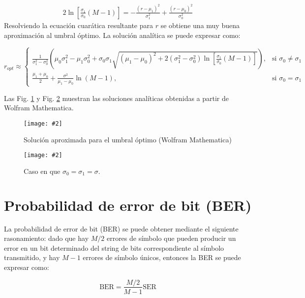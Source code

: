 \documentclass{article}
\newcommand{\fig}[3][1.0]{
    \begin{figure}[!ht]
        \centering
        \texttt{[image: \#2]}
        \caption{#3}
        \label{fig:#2}
    \end{figure}
}
\newcommand{\reffig}[1]{Fig. \ref{fig:#1}}
\begin{document}
        \begin{align}
            2\ln\left[\frac{\sigma_1}{\sigma_0}(M-1)\right] = -\frac{(r-\mu_1)^2}{\sigma_1^2}+\frac{(r-\mu_0)^2}{\sigma_0^2}
        \end{align}
        Resolviendo la ecuación cuarática resultante para $r$ se obtiene una muy buena aproximación al umbral óptimo. La solución analítica se puede expresar como:
        \begin{tcolorbox}[colback=yellow!20!white,colframe=black]
            \[
            r_{opt} \approx
            \begin{cases}
                \frac{1}{\sigma_1^2-\sigma_0^2}\left(\mu_0\sigma_1^2-\mu_1\sigma_0^2+\sigma_0\sigma_1\sqrt{(\mu_1-\mu_0)^2+2(\sigma_1^2-\sigma_0^2)\ln\left[\frac{\sigma_1}{\sigma_0}(M-1)\right]}\right),
                & \text{si } \sigma_0\neq\sigma_1\\
                \frac{\mu_1+\mu_0}{2} + \frac{\sigma^2}{\mu_1-\mu_0}\ln(M-1), & \text{si } \sigma_0=\sigma_1
            \end{cases}
            \]
        \end{tcolorbox}
        Las \reffig{threshold} y \reffig{threshold_s1_igual_s0} muestran
        las soluciones analíticas obtenidas a partir de Wolfram Mathematica. 
        
        \fig[0.9]{threshold}{Solución aproximada para el umbral óptimo (Wolfram Mathematica)}

        \fig[0.9]{threshold_s1_igual_s0}{Caso en que $\sigma_0=\sigma_1=\sigma$.}


\newpage
\section{Probabilidad de error de bit (BER)}
    La probabilidad de error de bit (BER) se puede obtener mediante el siguiente rasonamiento: dado que hay $M/2$ errores de símbolo que pueden producir un error en un bit determinado del string de bits correspondiente al símbolo transmitido, y hay $M-1$ errores de símbolo únicos, entonces la BER se puede expresar como:

    \begin{tcolorbox}[colback=green!20!white,colframe=black]
        \begin{equation}
            \text{BER} = \frac{M/2}{M-1}\text{SER}
        \end{equation}
    \end{tcolorbox}

\newpage
\appendix
\end{document}
